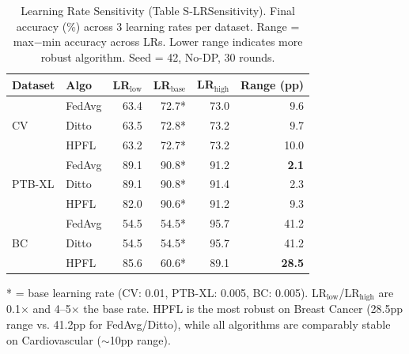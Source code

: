 \documentclass[conference]{IEEEtran}
\begin{document}
\begin{table}[!ht]
\centering
\caption{Learning Rate Sensitivity (Table S-LRSensitivity). Final accuracy (\%) across 3 learning rates per dataset. Range = max$-$min accuracy across LRs. Lower range indicates more robust algorithm. Seed = 42, No-DP, 30 rounds.}
\label{tab:s_lr_sensitivity}
\scriptsize
\begin{tabular}{llrrrr}
\toprule
\textbf{Dataset} & \textbf{Algo} & \textbf{LR$_{\text{low}}$} & \textbf{LR$_{\text{base}}$} & \textbf{LR$_{\text{high}}$} & \textbf{Range (pp)} \\
\midrule
\multirow{3}{*}{CV} & FedAvg & 63.4 & 72.7* & 73.0 & 9.6 \\
 & Ditto & 63.5 & 72.8* & 73.2 & 9.7 \\
 & HPFL & 63.2 & 72.7* & 73.2 & 10.0 \\
\midrule
\multirow{3}{*}{PTB-XL} & FedAvg & 89.1 & 90.8* & 91.2 & \textbf{2.1} \\
 & Ditto & 89.1 & 90.8* & 91.4 & 2.3 \\
 & HPFL & 82.0 & 90.6* & 91.2 & 9.3 \\
\midrule
\multirow{3}{*}{BC} & FedAvg & 54.5 & 54.5* & 95.7 & 41.2 \\
 & Ditto & 54.5 & 54.5* & 95.7 & 41.2 \\
 & HPFL & 85.6 & 60.6* & 89.1 & \textbf{28.5} \\
\bottomrule
\end{tabular}

\vspace{1mm}
\footnotesize{* = base learning rate (CV: 0.01, PTB-XL: 0.005, BC: 0.005). LR$_{\text{low}}$/LR$_{\text{high}}$ are 0.1$\times$ and 4--5$\times$ the base rate. HPFL is the most robust on Breast Cancer (28.5pp range vs. 41.2pp for FedAvg/Ditto), while all algorithms are comparably stable on Cardiovascular ($\sim$10pp range).}
\end{table}
\end{document}
